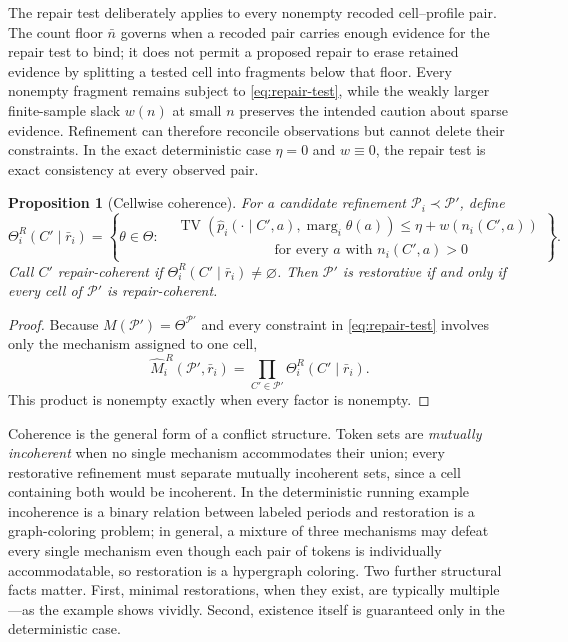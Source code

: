 \documentclass[11pt]{article}
\newtheorem{proposition}[assumption]{Proposition}
\theoremstyle{definition}
\newcommand{\emptysetset}{\varnothing}
\newcommand{\TV}{\operatorname{TV}}
\newcommand{\marg}[1]{\operatorname{marg}_{#1}}
\begin{document}
The repair test deliberately applies to every nonempty recoded cell--profile pair.
The count floor $\bar n$ governs when a recoded pair carries enough evidence for the repair test to bind; it does not permit a proposed repair to erase retained evidence by splitting a tested cell into fragments below that floor.
Every nonempty fragment remains subject to \cref{eq:repair-test}, while the weakly larger finite-sample slack $w(n)$ at small $n$ preserves the intended caution about sparse evidence.
Refinement can therefore reconcile observations but cannot delete their constraints.
In the exact deterministic case $\eta=0$ and $w\equiv0$, the repair test is exact consistency at every observed pair.

\begin{proposition}[Cellwise coherence]
\label{prop:coherence}
For a candidate refinement $\mathcal P_i\prec\mathcal P'$, define
\[
\Theta_i^{R}(C'\mid\bar r_i)
=
\left\{
\theta\in\Theta:
\begin{aligned}
&\TV\!\left(
  \hat p_i(\cdot\mid C',a),\marg{i}\theta(a)
 \right)
 \leq \eta+w\!\left(n_i(C',a)\right)\\[-0.2em]
&\hspace{7em}\text{for every $a$ with }n_i(C',a)>0
\end{aligned}
\right\}.
\]
Call $C'$ \emph{repair-coherent} if $\Theta_i^{R}(C'\mid\bar r_i)\neq\emptysetset$.
Then $\mathcal P'$ is restorative if and only if every cell of $\mathcal P'$ is repair-coherent.
\end{proposition}

\begin{proof}
Because $M(\mathcal P')=\Theta^{\mathcal P'}$ and every constraint in \cref{eq:repair-test} involves only the mechanism assigned to one cell,
\[
\widehat M_i^{\,R}(\mathcal P',\bar r_i)
=
\prod_{C'\in\mathcal P'}
\Theta_i^{R}(C'\mid\bar r_i).
\]
This product is nonempty exactly when every factor is nonempty.
\end{proof}

Coherence is the general form of a conflict structure.
Token sets are \emph{mutually incoherent} when no single mechanism accommodates their union; every restorative refinement must separate mutually incoherent sets, since a cell containing both would be incoherent.
In the deterministic running example incoherence is a binary relation between labeled periods and restoration is a graph-coloring problem; in general, a mixture of three mechanisms may defeat every single mechanism even though each pair of tokens is individually accommodatable, so restoration is a hypergraph coloring.
Two further structural facts matter.
First, minimal restorations, when they exist, are typically multiple---as the example shows vividly.
Second, existence itself is guaranteed only in the deterministic case.
\end{document}

